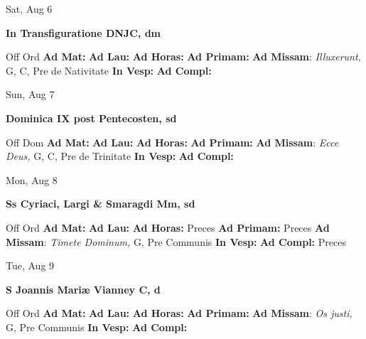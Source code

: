 \documentclass[10pt]{article}
\begin{document}
\begin{minipage}{3.5in}
\vspace{2em}\begin{center}
Sat, Aug 6
\end{center}\textbf{ \large In Transfiguratione DNJC, \textnormal{\normalsize dm}}
\begin{justify}
Off Ord
\textbf{Ad Mat: }
\textbf{Ad Lau: }
\textbf{Ad Horas: }
\textbf{Ad Primam: }
\textbf{Ad Missam}: \textit{Illuxerunt,} G, C, Pre de Nativitate
\textbf{In Vesp: }
\textbf{Ad Compl: }\end{justify}
\end{minipage}



\begin{minipage}{3.5in}
\vspace{2em}\begin{center}
Sun, Aug 7
\end{center}\textbf{ \large Dominica IX post Pentecosten, \textnormal{\normalsize sd}}
\begin{justify}
Off Dom
\textbf{Ad Mat: }
\textbf{Ad Lau: }
\textbf{Ad Horas: }
\textbf{Ad Primam: }
\textbf{Ad Missam}: \textit{Ecce Deus,} G, C, Pre de Trinitate
\textbf{In Vesp: }
\textbf{Ad Compl: }\end{justify}
\end{minipage}



\begin{minipage}{3.5in}
\vspace{2em}\begin{center}
Mon, Aug 8
\end{center}\textbf{ \large Ss Cyriaci, Largi \& Smaragdi Mm, \textnormal{\normalsize sd}}
\begin{justify}
Off Ord
\textbf{Ad Mat: }
\textbf{Ad Lau: }
\textbf{Ad Horas: }Preces
\textbf{Ad Primam: }Preces
\textbf{Ad Missam}: \textit{Timete Dominum,} G, Pre Communis
\textbf{In Vesp: }
\textbf{Ad Compl: }Preces\end{justify}
\end{minipage}



\begin{minipage}{3.5in}
\vspace{2em}\begin{center}
Tue, Aug 9
\end{center}\textbf{ \large S Joannis Mariæ Vianney C, \textnormal{\normalsize d}}
\begin{justify}
Off Ord
\textbf{Ad Mat: }
\textbf{Ad Lau: }
\textbf{Ad Horas: }
\textbf{Ad Primam: }
\textbf{Ad Missam}: \textit{Os justi,} G, Pre Communis
\textbf{In Vesp: }
\textbf{Ad Compl: }\end{justify}
\end{minipage}
\end{document}

